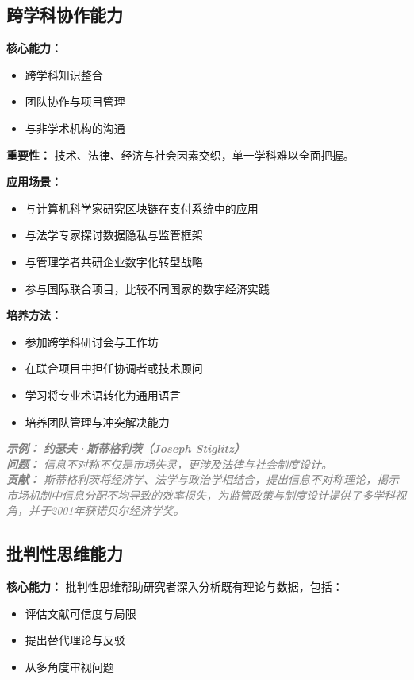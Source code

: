 \documentclass[lang=cn,12pt,a4paper]{elegantpaper}
\newcommand{\skillexample}[1]{\smallskip\noindent\textcolor{gray}{\textit{\footnotesize\textbf{示例：}} \textit{\footnotesize #1}}}
\begin{document}
\subsection{跨学科协作能力}\label{sec:interdisciplinary}
\textbf{核心能力：} 
\begin{itemize}
    \item 跨学科知识整合
    \item 团队协作与项目管理
    \item 与非学术机构的沟通
\end{itemize}

\textbf{重要性：} 技术、法律、经济与社会因素交织，单一学科难以全面把握。

\textbf{应用场景：} 
\begin{itemize}
    \item 与计算机科学家研究区块链在支付系统中的应用
    \item 与法学专家探讨数据隐私与监管框架
    \item 与管理学者共研企业数字化转型战略
    \item 参与国际联合项目，比较不同国家的数字经济实践
\end{itemize}

\textbf{培养方法：} 
\begin{itemize}
    \item 参加跨学科研讨会与工作坊
    \item 在联合项目中担任协调者或技术顾问
    \item 学习将专业术语转化为通用语言
    \item 培养团队管理与冲突解决能力
\end{itemize}

\skillexample{%
\textbf{约瑟夫·斯蒂格利茨（Joseph Stiglitz）}\\
\textbf{问题：} 信息不对称不仅是市场失灵，更涉及法律与社会制度设计。\\
\textbf{贡献：} 斯蒂格利茨将经济学、法学与政治学相结合，提出信息不对称理论，揭示市场机制中信息分配不均导致的效率损失，为监管政策与制度设计提供了多学科视角，并于2001年获诺贝尔经济学奖。}

\subsection{批判性思维能力}\label{sec:critical_thinking}
\textbf{核心能力：} 批判性思维帮助研究者深入分析既有理论与数据，包括：
\begin{itemize}
    \item 评估文献可信度与局限
    \item 提出替代理论与反驳
    \item 从多角度审视问题
\end{itemize}
\end{document}
